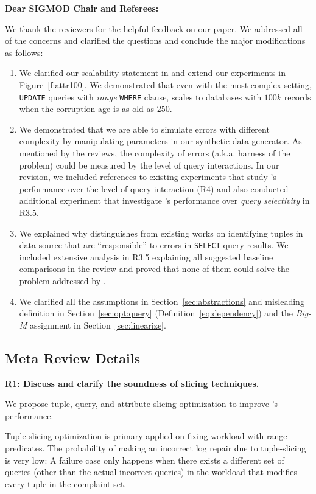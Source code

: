 \noindent \textbf{Dear SIGMOD Chair and Referees:}

We thank the reviewers for the helpful feedback on our paper. We addressed all of the concerns and clarified the questions and conclude the major modifications as follows:
\begin{enumerate}
\item We clarified our scalability statement in and extend our experiments in Figure~\ref{f:attr100}. We demonstrated that even with the most complex setting, \texttt{UPDATE} queries with \textit{range} \texttt{WHERE} clause, \sys scales to databases with $100k$ records when the corruption age is as old as $250$. 
\item We demonstrated that we are able to simulate errors with different complexity by manipulating parameters in our synthetic data generator. As mentioned by the reviews, the complexity of errors (a.k.a. harness of the problem) could be measured by the level of query interactions. In our revision, we included references to existing experiments that study \sys's performance over the level of query interaction (R4) and also conducted additional experiment that investigate \sys's performance over \textit{query selectivity} in R3.5. 
\item We explained why \sys distinguishes from existing works on identifying tuples in data source that are ``responsible'' to errors in \texttt{SELECT} query results. We included extensive analysis in R3.5 explaining all suggested baseline comparisons in the review and proved that none of them could solve the problem addressed by \sys. 
\item We clarified all the assumptions in Section~\ref{sec:abstractions} and misleading definition in Section~\ref{sec:opt:query} (Definition~\ref{eq:dependency}) and the \textit{Big-M} assignment in Section~\ref{sec:linearize}.
\end{enumerate}

\subsection*{Meta Review Details}
\noindent \textbf{R1: Discuss and clarify the soundness of slicing techniques.} 

We propose tuple, query, and attribute-slicing optimization to improve \sys's performance. 

Tuple-slicing optimization is primary applied on fixing workload with range predicates. The probability of making an incorrect log repair due to tuple-slicing is very low: A failure case only happens when there exists a different set of queries (other than the actual incorrect queries) in the workload that modifies every tuple in the complaint set. 

